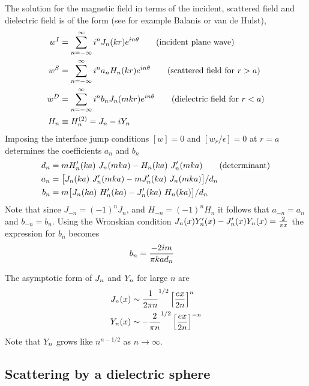 \documentclass[10pt]{article}
\begin{document}
The solution for the magnetic field
in terms of the incident, scattered field and dielectric field is of the form (see for example
Balanis\cite{Balanis89} or van de Hulst\cite{vanDeHulst57}), 
\begin{align*}
    w^I &= \sum_{n=-\infty}^\infty i^n J_n(kr) e^{i n \theta}  \qquad\mbox{(incident plane wave)} \\ 
    w^S &= \sum_{n=-\infty}^\infty i^n a_n H_n(kr) e^{i n \theta}  \qquad\mbox{(scattered field for $r>a$)} \\ 
    w^D &= \sum_{n=-\infty}^\infty i^n b_n J_n(m k r) e^{i n \theta}  \qquad\mbox{(dielectric field for $r<a$)} \\
    H_n &\equiv H_n^{(2)} = J_n - i Y_n \\
\end{align*}
Imposing the interface jump conditions $[w]=0$ and $[w_r/\epsilon]=0$ at $r=a$ determines the coefficients
$a_n$ and $b_n$
\begin{align*}
    d_n &= m H_n'(ka)~J_n(mka) - H_n(ka)~J_n'(mka) \qquad\mbox{(determinant)}\\
   a_n &= \big[ J_n(ka)~J_n'(mka) - m J_n'(ka)~J_n(mka) \big]/d_n \\
   b_n &= m \big[ J_n(ka)~H_n'(ka) - J_n'(ka)~H_n(ka) \big]/d_n
\end{align*}
Note that since $J_{-n}=(-1)^n J_n$, and $H_{-n}=(-1)^n H_n$ it follows that $a_{-n}=a_n$ and $b_{-n}=b_n$.
Using the Wronskian condition $J_n(x) Y_n'(x) - J_n'(x) Y_n(x) = {2\over \pi x}$ the expression
for $b_n$ becomes
\begin{align*}
   b_n &= {-2 i m \over \pi k a d_n }
\end{align*}

The asymptotic form of $J_n$ and $Y_n$ for large $n$ are
\begin{align*}
   J_n(x) & \sim  {1\over 2\pi n}^{1/2}\left[ e x \over 2 n \right]^n \\
   Y_n(x) & \sim  - {2\over \pi n}^{1/2}\left[ e x \over 2 n \right]^{-n}
\end{align*}
Note that $Y_n$ grows like $n^{n-1/2}$ as $n\rightarrow\infty$.


\clearpage
\subsection{Scattering by a dielectric sphere}



\newcommand{\cc}{\tilde{c}}
\clearpage
\end{document}
